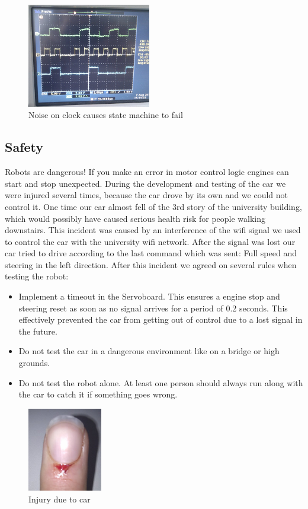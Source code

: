 \documentclass[a4paper
               ,10pt
               ,DIV=10 %
               ,BCOR=0.3cm
               ,pagesize %
               ,headings=small
               ,bibtotoc
               ]
               {scrartcl}
\begin{document}
\begin{figure}[H]
\begin{center}
\includegraphics[width=0.48\textwidth]{pic/spi.png}
\end{center}
\caption{Noise on clock causes state machine to fail}
\label{fignoise}
\end{figure}

\subsection{Safety}
Robots are dangerous! If you make an error in motor control logic engines can start and stop unexpected. During the development and testing of the car we were injured several times, because the car drove by its own and we could not control it. One time our car almost fell of the 3rd story of the university building, which would possibly have caused serious health risk for people walking downstairs. This incident was caused by an interference of the wifi signal we used to control the car with the university wifi network. After the signal was lost our car tried to drive according to the last command which was sent: Full speed and steering in the left direction. After this incident we agreed on several rules when testing the robot:
\begin{itemize}
  \item Implement a timeout in the Servoboard. This ensures a engine stop and steering reset as soon as no signal arrives for a period of 0.2 seconds. This effectively prevented the car from getting out of control due to a lost signal in the future.
  \item Do not test the car in a dangerous environment like on a bridge or high grounds.
  \item Do not test the robot alone. At least one person should always run along with the car to catch it if something goes wrong.
\end{itemize}
\begin{figure}[H]
\begin{center}
\includegraphics[width=0.29\textwidth]{pic/finger.png}
\end{center}
\caption{Injury due to car}
\label{figinjury}
\end{figure}
\end{document}
